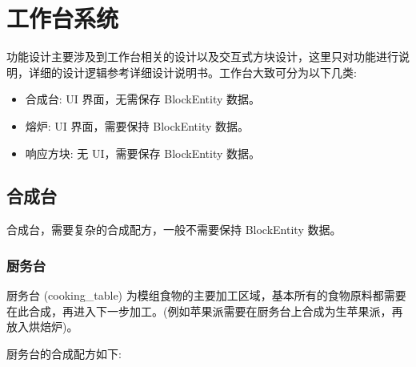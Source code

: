 \section{工作台系统}

功能设计主要涉及到工作台相关的设计以及交互式方块设计，这里只对功能进行说明，详细的设计逻辑参考详细设计说明书。工作台大致可分为以下几类:
\begin{itemize}
    \item 合成台: UI 界面，无需保存 BlockEntity 数据。
    \item 熔炉: UI 界面，需要保持 BlockEntity 数据。
    \item 响应方块: 无 UI，需要保存 BlockEntity 数据。
\end{itemize}

\subsection{合成台}

合成台，需要复杂的合成配方，一般不需要保持 BlockEntity 数据。

\subsubsection{厨务台}

厨务台 (cooking\_table) 为模组食物的主要加工区域，基本所有的食物原料都需要在此合成，再进入下一步加工。(例如苹果派需要在厨务台上合成为生苹果派，再放入烘焙炉)。

厨务台的合成配方如下:

